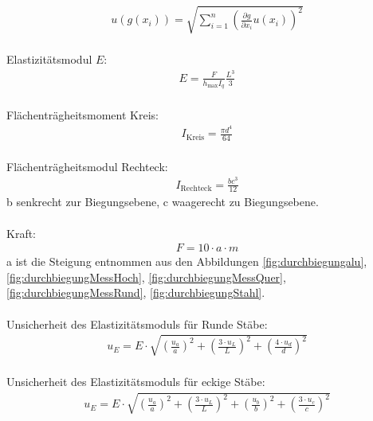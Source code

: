 \begin{align}
	u(g(x_i))=   \sqrt{  \sum_{i=1}^{n} \left( \frac{\partial g}{\partial x_i} u(x_i) \right)^2  }
	\label{eq:kombsu}       
\end{align} 
\\
Elastizitätsmodul $E$:
\begin{align}
	E=\frac{F}{h_{\text{max}} I_q}\frac{L^3}{3}
	\label{eq:Elast}
\end{align}
\\
Flächenträgheitsmoment Kreis:
\begin{align}
	I_{\text{Kreis}}=\frac{\pi d^4}{64}
		\label{eq:TrägKreis}
\end{align}
\\
Flächenträgheitsmodul Rechteck:
\begin{align}		
	I_{\text{Rechteck}}= \frac{bc^3}{12}
	\label{eq:TrägRecht}
\end{align}
b senkrecht zur Biegungsebene, c waagerecht zu Biegungsebene.
\\
\\
Kraft:
\begin{align}
	F=10 \cdot a \cdot m
\end{align}
	a ist die Steigung entnommen aus den Abbildungen \ref{fig:durchbiegungalu}, \ref{fig:durchbiegungMessHoch}, \ref{fig:durchbiegungMessQuer}, \ref{fig:durchbiegungMessRund}, \ref{fig:durchbiegungStahl}.
\\	
\\
Unsicherheit des Elastizitätsmoduls für Runde Stäbe:
\begin{align}
	u_E= E\cdot \sqrt{\left(\frac{u_a}{a}\right)^2+ \left(\frac{3\cdot u_L}{L}\right)^2 + \left( \frac{4 \cdot u_d}{d}\right)^2}
\end{align}	
\\
Unsicherheit des Elastizitätsmoduls für eckige Stäbe:
\begin{align}
	u_E= E \cdot \sqrt{ \left(\frac{u_a}{a}\right)^2 + \left( \frac{3 \cdot u_L}{L}\right)^2 + \left( \frac{u_b}{b}\right)^2 + \left(\frac{3 \cdot u_c}{c} \right)^2}
\end{align}
	
	


